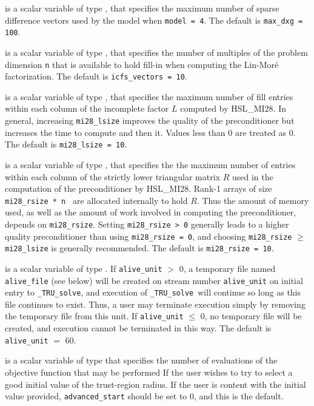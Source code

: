 \documentclass{galahad}
\newcommand{\packagename}{TRU}
\newcommand{\fullpackagename}{\libraryname\_\packagename}
\newcommand{\solver}{{\tt \fullpackagename\_solve}}
\begin{document}
\begin{description}
 is a scalar variable of type \integer,
that specifies the maximum number of sparse difference
vectors used by the model when {\tt model = 4}.
The default is {\tt max\_dxg = 100}.

 is a scalar variable of type \integer,
that specifies the number of multiples of the problem dimension {\tt n}
that is available to hold fill-in when computing the Lin-Mor\'{e}
factorization.
The default is {\tt icfs\_vectors = 10}.

 is a scalar variable of type \integer,
that specifies the maximum number of fill entries within each column
of the incomplete factor $L$ computed by HSL\_MI28. In general,
increasing {\tt mi28\_lsize} improves the quality of the preconditioner
but increases the time to compute and then it. Values less than 0 are
treated as 0.
The default is {\tt mi28\_lsize = 10}.

 is a scalar variable of type \integer,
that specifies the the maximum number of entries within each column of the
strictly lower triangular matrix $R$ used in the computation of the
preconditioner by HSL\_MI28.  Rank-1 arrays of size {\tt mi28\_rsize * n }
are allocated internally to hold $R$. Thus the amount of memory used, as well
as the amount of work involved in computing the preconditioner, depends on
{\tt mi28\_rsize}. Setting {\tt mi28\_rsize > 0} generally leads to a
higher quality preconditioner than using {\tt mi28\_rsize = 0}, and
choosing {\tt mi28\_rsize} $\geq$ {\tt mi28\_lsize} is generally
recommended.
The default is {\tt mi28\_rsize = 10}.


 is a scalar variable of type \integer.
If {\tt alive\_unit} $>$ 0, a temporary file named {\tt alive\_file} (see below)
will be created on stream number {\tt alive\_unit} on initial entry to
\solver, and execution of \solver\ will continue so
long as this file continues to exist. Thus, a user may terminate execution
simply by removing the temporary file from this unit.
If {\tt alive\_unit} $\leq$ 0, no temporary file will be created, and
execution cannot be terminated in this way.
The default is {\tt alive\_unit} $=$ 60.

 is a scalar variable of type \integer that
specifies the number of evaluations of the objective function that may
be performed If the user wishes to try to select a good initial value of the
trust-region radius. If the user is content with the initial value provided,
{\tt advanced\_start} should be set to 0, and this is the default.


\end{description}
\end{document}
